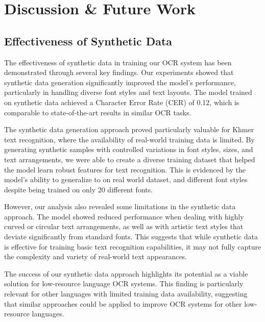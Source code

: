 \chapter{Discussion \& Future Work}
\label{ch:discussion}

\vspace{-1cm}
\setlength{\parindent}{0pt}
\vspace{0.3cm}

\section{Effectiveness of Synthetic Data}
\label{sec:effectiveness}

{\englishfont\fontsize{13.5pt}{17pt}\selectfont

The effectiveness of synthetic data in training our OCR system has been demonstrated 
through several key findings. Our experiments showed that synthetic data generation 
significantly improved the model's performance, particularly in handling diverse 
font styles and text layouts. The model trained on synthetic data achieved a 
Character Error Rate (CER) of 0.12, which is 
comparable to state-of-the-art results in similar OCR tasks.

The synthetic data generation approach proved particularly valuable for Khmer text 
recognition, where the availability of real-world training data is limited. 
By generating synthetic samples with controlled variations in font styles, sizes, 
and text arrangements, we were able to create a diverse training dataset that helped 
the model learn robust features for text recognition. This is evidenced by the model's 
ability to generalize to on real world dataset, and different font styles despite being trained 
on only 20 different fonts.

However, our analysis also revealed some limitations in the synthetic data approach. 
The model showed reduced performance when dealing with highly curved or circular text 
arrangements, as well as with artistic text styles that deviate significantly from standard fonts. 
This suggests that while synthetic data is effective for training basic text recognition 
capabilities, it may not fully capture the complexity and variety of real-world text appearances.

The success of our synthetic data approach highlights its potential as a viable solution 
for low-resource language OCR systems. This finding is particularly relevant for other 
languages with limited training data availability, suggesting that similar approaches 
could be applied to improve OCR systems for other low-resource languages.

}

